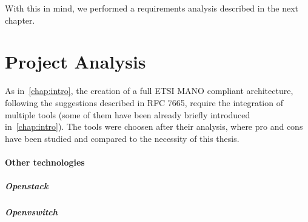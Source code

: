\documentclass[10pt]{book}
\begin{document}
\noindent With this in mind, we performed a requirements analysis described in 
the next chapter.

\chapter{Project Analysis}
\label{chap:prjan}

As in~\ref{chap:intro}, the creation of a full ETSI MANO compliant
architecture, following the suggestions described in RFC 7665, require the 
integration of multiple tools (some of them have been already briefly 
introduced in~\ref{chap:intro}). The tools were choosen after their 
analysis, where pro and cons have been studied and compared to the necessity of 
this thesis.






\subsubsection{Other technologies}
\paragraph{Openstack}
\paragraph{Openvswitch}
\end{document}
